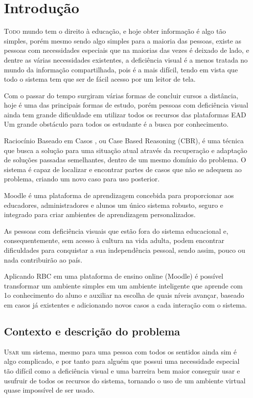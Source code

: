 \chapter{Introdução} \label{chap:Introdução}
\lettrine{T}{odo} mundo tem o direito à educação, e hoje obter informação é algo tão simples, porém mesmo sendo algo simples para a maioria das pessoas, existe as pessoas com necessidades especiais que na maiorias das vezes é deixado de lado, e dentre as várias necessidades existentes, a deficiência visual é a menos tratada no mundo da informação compartilhada, pois é a mais difícil, tendo em vista que todo o sistema tem que ser de fácil acesso por um leitor de tela.

Com o passar do tempo surgiram várias formas de concluir cursos a distância, hoje é uma das principais formas de estudo, porém pessoas com deficiência visual ainda tem grande dificuldade em utilizar todos os recursos das plataformas EAD Um grande obstáculo para todos os estudante é a busca por conhecimento.

Raciocínio Baseado em Casos , ou Case Based Reasoning (CBR), é uma técnica que busca a solução para uma situação atual através da recuperação e adaptação de soluções passadas semelhantes, dentro de um mesmo domínio do problema. O sistema é capaz de localizar e encontrar partes de casos que não se adequem ao problema, criando um novo caso para uso posterior.

Moodle é uma plataforma de aprendizagem concebida para proporcionar aos educadores, administradores e alunos um único sistema robusto, seguro e integrado para criar ambientes de aprendizagem personalizados.

As pessoas com deficiência visuais que estão fora do sistema educacional e, consequentemente, sem acesso à cultura na vida adulta, podem encontrar dificuldades para conquistar a sua independência pessoal, sendo assim, pouco ou nada contribuirão ao país.

Aplicando RBC em uma plataforma de ensino online (Moodle) é possível transformar um ambiente simples em um ambiente inteligente que aprende com 1o conhecimento do aluno e auxiliar na escolha de quais níveis avançar, baseado em casos já existentes e adicionando novos casos a cada interação com o sistema.


\section{Contexto e descrição do problema}
\lettrine{U}{sar} um sistema, mesmo para uma pessoa com todos os sentidos ainda sim é algo complicado, e por tanto para alguém que possui uma necessidade especial tão difícil como a deficiência visual e uma barreira bem maior conseguir usar e usufruir de todos os recursos do sistema, tornando o uso de um ambiente virtual quase impossível de ser usado.

